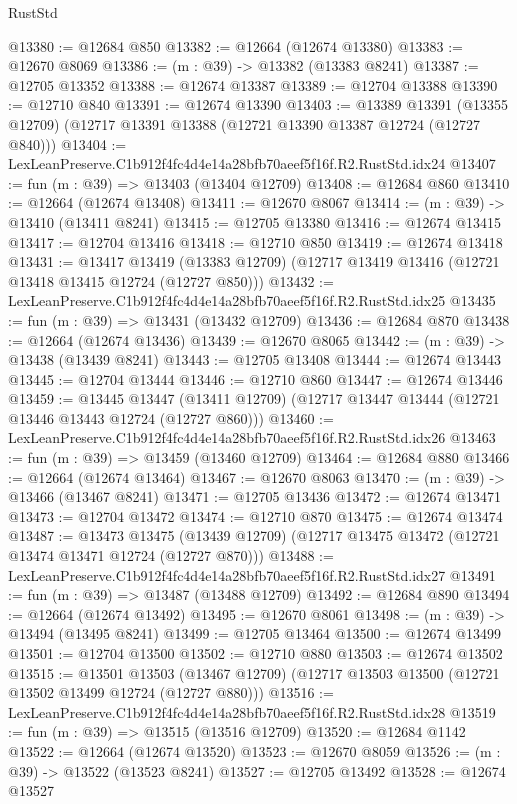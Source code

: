 \begin{lexlean}{RustStd}
\begin{coremodule}
@13380 := @12684 @850
@13382 := @12664 (@12674 @13380)
@13383 := @12670 @8069
@13386 := (m : @39) -> @13382 (@13383 @8241)
@13387 := @12705 @13352
@13388 := @12674 @13387
@13389 := @12704 @13388
@13390 := @12710 @840
@13391 := @12674 @13390
@13403 := @13389
    @13391
    (@13355 @12709)
    (@12717 @13391 @13388 (@12721 @13390 @13387 @12724 (@12727 @840)))
@13404 := LexLeanPreserve.C1b912f4fc4d4e14a28bfb70aeef5f16f.R2.RustStd.idx24
@13407 := fun (m : @39) => @13403 (@13404 @12709)
@13408 := @12684 @860
@13410 := @12664 (@12674 @13408)
@13411 := @12670 @8067
@13414 := (m : @39) -> @13410 (@13411 @8241)
@13415 := @12705 @13380
@13416 := @12674 @13415
@13417 := @12704 @13416
@13418 := @12710 @850
@13419 := @12674 @13418
@13431 := @13417
    @13419
    (@13383 @12709)
    (@12717 @13419 @13416 (@12721 @13418 @13415 @12724 (@12727 @850)))
@13432 := LexLeanPreserve.C1b912f4fc4d4e14a28bfb70aeef5f16f.R2.RustStd.idx25
@13435 := fun (m : @39) => @13431 (@13432 @12709)
@13436 := @12684 @870
@13438 := @12664 (@12674 @13436)
@13439 := @12670 @8065
@13442 := (m : @39) -> @13438 (@13439 @8241)
@13443 := @12705 @13408
@13444 := @12674 @13443
@13445 := @12704 @13444
@13446 := @12710 @860
@13447 := @12674 @13446
@13459 := @13445
    @13447
    (@13411 @12709)
    (@12717 @13447 @13444 (@12721 @13446 @13443 @12724 (@12727 @860)))
@13460 := LexLeanPreserve.C1b912f4fc4d4e14a28bfb70aeef5f16f.R2.RustStd.idx26
@13463 := fun (m : @39) => @13459 (@13460 @12709)
@13464 := @12684 @880
@13466 := @12664 (@12674 @13464)
@13467 := @12670 @8063
@13470 := (m : @39) -> @13466 (@13467 @8241)
@13471 := @12705 @13436
@13472 := @12674 @13471
@13473 := @12704 @13472
@13474 := @12710 @870
@13475 := @12674 @13474
@13487 := @13473
    @13475
    (@13439 @12709)
    (@12717 @13475 @13472 (@12721 @13474 @13471 @12724 (@12727 @870)))
@13488 := LexLeanPreserve.C1b912f4fc4d4e14a28bfb70aeef5f16f.R2.RustStd.idx27
@13491 := fun (m : @39) => @13487 (@13488 @12709)
@13492 := @12684 @890
@13494 := @12664 (@12674 @13492)
@13495 := @12670 @8061
@13498 := (m : @39) -> @13494 (@13495 @8241)
@13499 := @12705 @13464
@13500 := @12674 @13499
@13501 := @12704 @13500
@13502 := @12710 @880
@13503 := @12674 @13502
@13515 := @13501
    @13503
    (@13467 @12709)
    (@12717 @13503 @13500 (@12721 @13502 @13499 @12724 (@12727 @880)))
@13516 := LexLeanPreserve.C1b912f4fc4d4e14a28bfb70aeef5f16f.R2.RustStd.idx28
@13519 := fun (m : @39) => @13515 (@13516 @12709)
@13520 := @12684 @1142
@13522 := @12664 (@12674 @13520)
@13523 := @12670 @8059
@13526 := (m : @39) -> @13522 (@13523 @8241)
@13527 := @12705 @13492
@13528 := @12674 @13527

\end{coremodule}
\end{lexlean}
